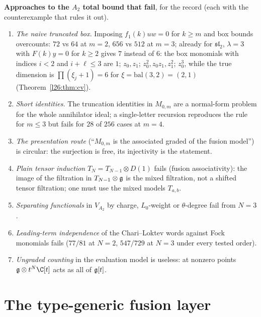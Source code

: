 \begin{warning}
\textbf{Approaches to the $A_2$ total bound that fail}, for the record (each with the counterexample that rules it out).
\begin{enumerate}
\item \emph{The naive truncated box.} Imposing $f_1(k)uw=0$ for $k\ge m$ and box bounds overcounts: $72$ vs $64$ at $m=2$,
  $656$ vs $512$ at $m=3$; already for $\mathfrak{sl}_2$, $\lambda=3$ with $F(k)y=0$ for $k\ge2$ gives $7$ instead of $6$: the
  box monomials with indices $i<2$ and $i+\ell\le3$ are $1$; $z_0,z_1$; $z_0^2,z_0z_1,z_1^2$; $z_0^3$, while the true dimension is
  $\prod(\xi_j+1)=6$ for $\xi=\mathrm{bal}(3,2)=(2,1)$ (Theorem~\ref{l26:thm:cv}).
\item \emph{Short identities.} The truncation identities in $M_{0,m}$ are a normal-form problem for the whole annihilator
  ideal; a single-letter recursion reproduces the rule for $m\le3$ but fails for $28$ of $256$ cases at $m=4$.
\item \emph{The presentation route} (``$M_{0,m}$ is the associated graded of the fusion model'') is circular: the
  surjection is free, its injectivity is the statement.
\item \emph{Plain tensor induction} $T_N=T_{N-1}\otimes D(1)$ fails (fusion associativity): the image of the filtration in
  $T_{N-1}\otimes\mathfrak g$ is the mixed filtration, not a shifted tensor filtration; one must use the mixed models
  $T_{a,b}$.
\item \emph{Separating functionals} in $V_{A_2}$ by charge, $L_0$-weight or $\theta$-degree fail from $N=3$.
\item \emph{Leading-term independence} of the Chari--Loktev words against Fock monomials fails ($77/81$ at $N=2$,
  $547/729$ at $N=3$ under every tested order).
\item \emph{Ungraded counting} in the evaluation model is useless: at nonzero points $\ltwentysixg\otimes t^N\C[t]$ acts as
  all of $\mathfrak g[t]$.
\end{enumerate}
\end{warning}

\section{The type-generic fusion layer}\label{l26:sec:generic}

